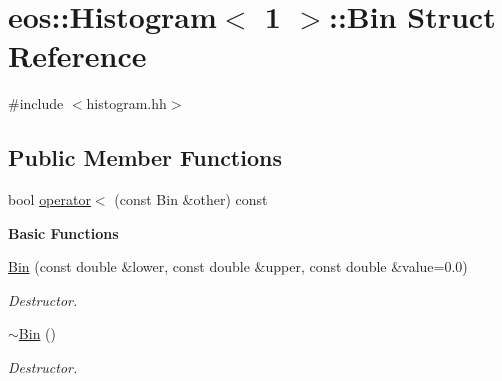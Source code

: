 \hypertarget{structeos_1_1Histogram_3_011_01_4_1_1Bin}{
\section{eos::Histogram$<$ 1 $>$::Bin Struct Reference}
\label{structeos_1_1Histogram_3_011_01_4_1_1Bin}
}


{\ttfamily \#include $<$histogram.hh$>$}\subsection*{Public Member Functions}
\begin{DoxyCompactItemize}
\item 
bool \hyperlink{structeos_1_1Histogram_3_011_01_4_1_1Bin_ada41b1d9c9cbec8e57ee4e96558e558b}{operator$<$} (const Bin \&other) const 
\end{DoxyCompactItemize}
\begin{Indent}{\bf Basic Functions}\par
{\em \label{_amgrp2386c9a1f1785edee33f374dd2db9b3d}
 }\begin{DoxyCompactItemize}
\item 
\hyperlink{structeos_1_1Histogram_3_011_01_4_1_1Bin_a017fce44f09224396431178d57aaa114}{Bin} (const double \&lower, const double \&upper, const double \&value=0.0)
\begin{DoxyCompactList}\small\item\em Destructor. \item\end{DoxyCompactList}\item 
\hyperlink{structeos_1_1Histogram_3_011_01_4_1_1Bin_a5da88553377af08fad99aa914a634c38}{$\sim$Bin} ()
\begin{DoxyCompactList}\small\item\em Destructor. \item\end{DoxyCompactList}\end{DoxyCompactItemize}
\end{Indent}
